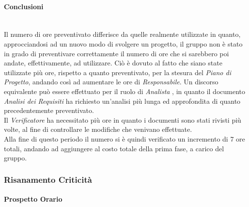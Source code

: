 \paragraph{Conclusioni} \-\\
Il numero di ore preventivato differisce da quelle realmente utilizzate in quanto, approcciandosi ad un nuovo modo di svolgere un progetto, il gruppo non è stato in grado di preventivare correttamente il numero di ore che si sarebbero poi andate, effettivamente, ad utilizzare. Ciò è dovuto al fatto che siano state utilizzate più ore, rispetto a quanto preventivato, per la stesura del \textit{Piano di Progetto}, andando così ad aumentare le ore di \textit{Responsabile}. Un discorso equivalente può essere effettuato per il ruolo di \textit{Analista} , in quanto il documento \textit{Analisi dei Requisiti} ha richiesto un'analisi più lunga ed approfondita di quanto precedentemente preventivato. \\
Il \textit{Verificatore} ha necessitato più ore in quanto i documenti sono stati rivisti più volte, al fine di controllare le modifiche che venivano effettuate. \\
Alla fine di questo periodo il numero si è quindi verificato un incremento di 7 ore totali, andando ad aggiungere  al costo totale della prima fase, a carico del gruppo. 

\subsubsection{Risanamento Criticità}
\label{RA1}

\paragraph{Prospetto Orario} \-\\

